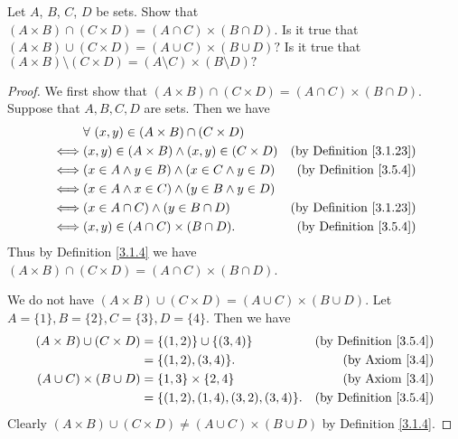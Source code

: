 \begin{exercise}\label{ex 3.5.5}
Let \(A\), \(B\), \(C\), \(D\) be sets.
Show that \((A \times B) \cap (C \times D) = (A \cap C) \times (B \cap D)\).
Is it true that \((A \times B) \cup (C \times D) = (A \cup C) \times (B \cup D)?\)
Is it true that \((A \times B) \setminus (C \times D) = (A \setminus C) \times (B \setminus D)?\)
\end{exercise}

\begin{proof}
We first show that \((A \times B) \cap (C \times D) = (A \cap C) \times (B \cap D)\).
Suppose that \(A, B, C, D\) are sets.
Then we have
\begin{align*}
& \forall\ (x, y) \in (A \times B) \cap (C \times D) \\
\iff & (x, y) \in (A \times B) \land (x, y) \in (C \times D) & \text{(by Definition \ref{3.1.23})} \\
\iff & (x \in A \land y \in B) \land (x \in C \land y \in D) & \text{(by Definition \ref{3.5.4})} \\
\iff & (x \in A \land x \in C) \land (y \in B \land y \in D) \\
\iff & (x \in A \cap C) \land (y \in B \cap D) & \text{(by Definition \ref{3.1.23})} \\
\iff & (x, y) \in (A \cap C) \times (B \cap D). & \text{(by Definition \ref{3.5.4})}
\end{align*}
Thus by Definition \ref{3.1.4} we have \((A \times B) \cap (C \times D) = (A \cap C) \times (B \cap D)\).

We do not have \((A \times B) \cup (C \times D) = (A \cup C) \times (B \cup D)\).
Let \(A = \{1\}, B = \{2\}, C = \{3\}, D = \{4\}\).
Then we have
\begin{align*}
(A \times B) \cup (C \times D) &= \{(1, 2)\} \cup \{(3, 4)\} & \text{(by Definition \ref{3.5.4})} \\
&= \{(1, 2), (3, 4)\}. & \text{(by Axiom \ref{3.4})} \\
(A \cup C) \times (B \cup D) &= \{1, 3\} \times \{2, 4\} & \text{(by Axiom \ref{3.4})} \\
&= \{(1, 2), (1, 4), (3, 2), (3, 4)\}. & \text{(by Definition \ref{3.5.4})}
\end{align*}
Clearly \((A \times B) \cup (C \times D) \neq (A \cup C) \times (B \cup D)\) by Definition \ref{3.1.4}.


\end{proof}
